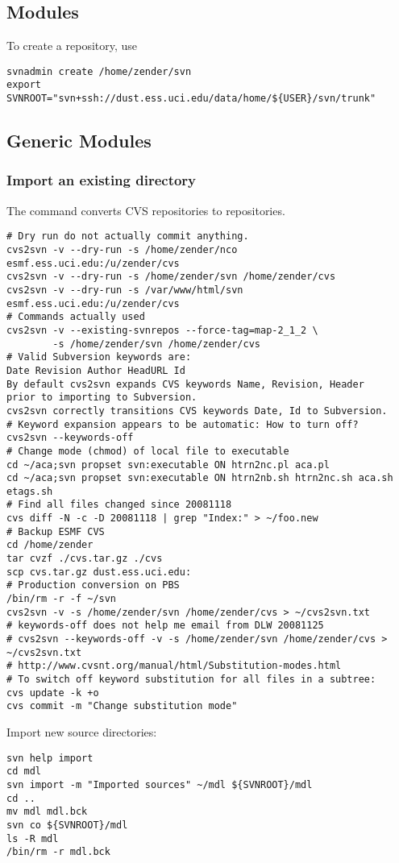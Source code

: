 \documentclass[12pt,twoside]{article}
\begin{document}
\subsection{Modules}\label{sxn:svn_mdl}
To create a  repository, use
\begin{verbatim}
svnadmin create /home/zender/svn
export SVNROOT="svn+ssh://dust.ess.uci.edu/data/home/${USER}/svn/trunk"
\end{verbatim}

\subsection{Generic Modules}\label{sxn:svn_gnr}

\subsubsection[Import]{Import an existing directory}\label{sxn:cvs_mpr}
The  command converts CVS repositories to
 repositories.
\begin{verbatim}
# Dry run do not actually commit anything.
cvs2svn -v --dry-run -s /home/zender/nco esmf.ess.uci.edu:/u/zender/cvs
cvs2svn -v --dry-run -s /home/zender/svn /home/zender/cvs
cvs2svn -v --dry-run -s /var/www/html/svn esmf.ess.uci.edu:/u/zender/cvs
# Commands actually used
cvs2svn -v --existing-svnrepos --force-tag=map-2_1_2 \
        -s /home/zender/svn /home/zender/cvs
# Valid Subversion keywords are:
Date Revision Author HeadURL Id
By default cvs2svn expands CVS keywords Name, Revision, Header 
prior to importing to Subversion.
cvs2svn correctly transitions CVS keywords Date, Id to Subversion.
# Keyword expansion appears to be automatic: How to turn off?
cvs2svn --keywords-off
# Change mode (chmod) of local file to executable
cd ~/aca;svn propset svn:executable ON htrn2nc.pl aca.pl
cd ~/aca;svn propset svn:executable ON htrn2nb.sh htrn2nc.sh aca.sh etags.sh 
# Find all files changed since 20081118
cvs diff -N -c -D 20081118 | grep "Index:" > ~/foo.new
# Backup ESMF CVS
cd /home/zender
tar cvzf ./cvs.tar.gz ./cvs
scp cvs.tar.gz dust.ess.uci.edu:
# Production conversion on PBS
/bin/rm -r -f ~/svn
cvs2svn -v -s /home/zender/svn /home/zender/cvs > ~/cvs2svn.txt
# keywords-off does not help me email from DLW 20081125
# cvs2svn --keywords-off -v -s /home/zender/svn /home/zender/cvs > ~/cvs2svn.txt
# http://www.cvsnt.org/manual/html/Substitution-modes.html
# To switch off keyword substitution for all files in a subtree: 
cvs update -k +o
cvs commit -m "Change substitution mode"
\end{verbatim}
Import new source directories:
\begin{verbatim}
svn help import
cd mdl
svn import -m "Imported sources" ~/mdl ${SVNROOT}/mdl
cd ..
mv mdl mdl.bck
svn co ${SVNROOT}/mdl
ls -R mdl
/bin/rm -r mdl.bck
\end{verbatim}
\end{document}
